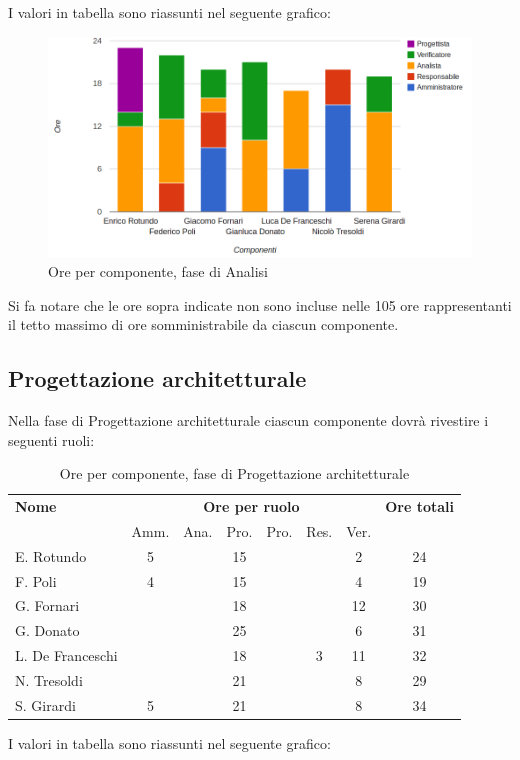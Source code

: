 I valori in tabella sono riassunti nel seguente grafico: \\ 

\begin{figure}[H]
\centering
\includegraphics[scale=0.35]{4-1.png}
\caption{Ore per componente, fase di Analisi\label{fig:nome}}
\end{figure}

Si fa notare che le ore sopra indicate non sono incluse nelle 105 ore rappresentanti il tetto massimo di ore somministrabile da ciascun componente.

\subsection{Progettazione architetturale}

Nella fase di Progettazione architetturale ciascun componente dovrà rivestire i seguenti ruoli:

\begin{table}[H]
\centering
\begin{tabular}{lccccccc}
\toprule 
    \textbf{Nome}  & \multicolumn{6}{c}{\textbf{Ore per ruolo}} & \textbf{Ore totali} \\
    & Amm. & Ana. & Pro. & Pro. & Res. & Ver. \\
    \midrule
    E. Rotundo   	& 5 &  &	 15	& &   &	2 &	24 \\
    F. Poli  		& 4	&  &	 15	& &   & 4 & 19 \\
    G. Fornari		& 	&  &	 18	& &   &	12 & 30 \\
    G. Donato 		& 	&  &	 25	& &   &	6 & 31 \\
    L. De Franceschi 	& 	&  &	 18	& & 3 &	11 & 32 \\
    N. Tresoldi 		& 	&  &	 21	& &   & 8 & 29 \\
   	S. Girardi 		& 5	&  &	 21	& &   &	8 & 34 \\
    
    \bottomrule
\end{tabular}
\caption{Ore per componente, fase di Progettazione architetturale}
\end{table}
I valori in tabella sono riassunti nel seguente grafico: \\ \\ \\

